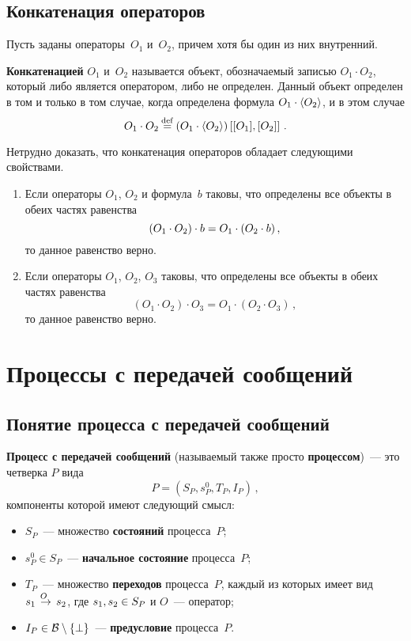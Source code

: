 \begin{multicols}{2}
\subsection{Конкатенация операторов}

Пусть заданы операторы~$O_1$ и~$O_2$, причем хотя бы один из них внутренний.

{\bf Конкатенацией} $O_1$ и~$O_2$ называется объект, обозначаемый
записью $O_1\cdot O_2$, который либо является оператором, либо не определен.
Данный объект определен в том и только в том случае, когда определена формула
$O_1 \cdot \langle{O_2}\rangle$, и в этом случае
$$
O_1\cdot O_2\mathbin{{\mathop{=}\limits^{\mathrm{def}}}} (O_1 \cdot \langle{O_2}\rangle)\left[[O_1], [O_2]\right]\,.
$$

Нетрудно доказать, что конкатенация операторов обладает следующими свойствами.
\begin{enumerate}[1.]
\item  Если операторы $O_1$, $O_2$ и формула~$b$
таковы, что определены все объекты в обеих частях равенства
$$
(O_1\cdot O_2) \cdot b = O_1 \cdot (O_2 \cdot b)\,,
$$
то данное равенство верно.
\item Если операторы $O_1$, $O_2$, $O_3$ таковы, что определены
все объекты в обеих частях равенства
$$
(O_1\cdot O_2)\cdot O_3 = O_1\cdot (O_2\cdot O_3)\,,
$$
то данное равенство верно.
\end{enumerate}

\section{Процессы с передачей сообщений}

\subsection{Понятие процесса с передачей сообщений}

{\bf Процесс с передачей сообщений} (называемый также просто {\bf
процессом})~--- это четверка $P$ вида
\begin{equation}
\label{process}
P=(S_P, s^0_P, T_P, I_P)\,,\end{equation}
компоненты которой имеют следующий смысл:
\begin{itemize}
\item $S_P$~---
множество {\bf состояний} процесса~$P$;
\item $s^0_P \in S_P$~--- {\bf начальное состояние} процесса~$P$;
\item $T_P$~--- множество {\bf переходов} процесса~$P$,
каждый из которых имеет вид $s_1\;\mathop{\to}\limits^{\!\!\!O}\;s_2$,
где $s_1, s_2 \hm\in S_P$ и $O$~--- оператор;
\item $I_P\in {\cal B}\setminus \{\bot\}$~--- {\bf предусловие} процесса~$P$.
\end{itemize}


\end{multicols}

